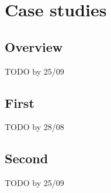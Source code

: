 \chapter{Case studies}

\section{Overview}
\label{sec:casestudies:overview}
TODO by 25/09

\section{First}

TODO by 28/08


\section{Second}

TODO by 25/09